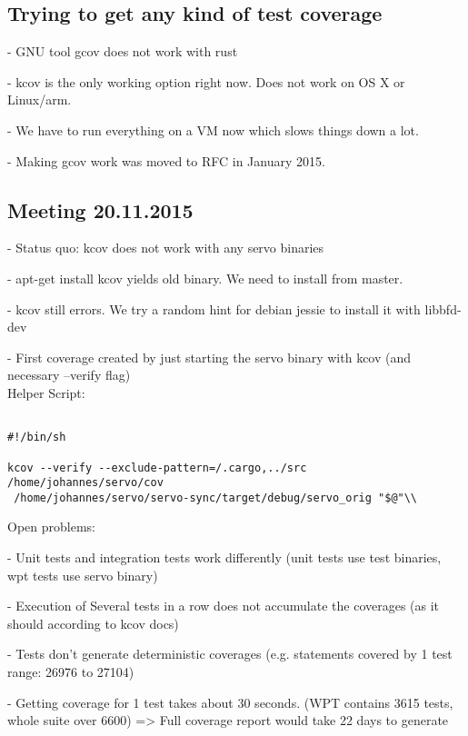 \documentclass{scrartcl}
\begin{document}
\subsection*{Trying to get any kind of test coverage}
- GNU tool gcov does not work with rust

- kcov is the only working option right now. Does not work on OS X or Linux/arm.

- We have to run everything on a VM now which slows things down a lot.

- Making gcov work was moved to RFC in January 2015.

\subsection*{Meeting 20.11.2015}
- Status quo: kcov does not work with any servo binaries

- apt-get install kcov yields old binary. We need to install from master.

- kcov still errors. We try a random hint for debian jessie to install it with libbfd-dev

- First coverage created by just starting the servo binary with kcov (and necessary --verify flag)\\

Helper Script:

\lstset{language=Python}  
\begin{lstlisting}

#!/bin/sh

kcov --verify --exclude-pattern=/.cargo,../src /home/johannes/servo/cov 
 /home/johannes/servo/servo-sync/target/debug/servo_orig "$@"\\

\end{lstlisting}

Open problems:

- Unit tests and integration tests work differently (unit tests use test binaries, wpt tests use servo binary)

- Execution of Several tests in a row does not accumulate the coverages (as it should according to kcov docs)

- Tests don't generate deterministic coverages (e.g. statements covered by 1 test range: 26976 to 27104)

- Getting coverage for 1 test takes about 30 seconds. (WPT contains 3615 tests, whole suite over 6600) => Full coverage report would take 22 days to generate
\end{document}
